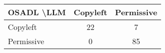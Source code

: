 \begin{tabular}{l|cc}\hline
	\textbf{OSADL \textbackslash LLM} & Copyleft & Permissive\\\hline
	Copyleft & 22 & 7\\
	Permissive & 0 & 85\\\hline
\end{tabular}
